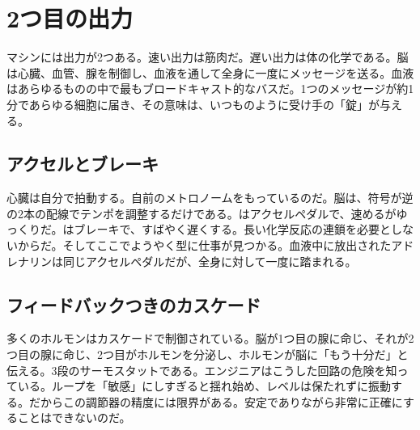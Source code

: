 \chapter{2つ目の出力}

マシンには出力が2つある。速い出力は筋肉だ。遅い出力は体の化学である。脳は心臓、血管、腺を制御し、血液を通して全身に一度にメッセージを送る。血液はあらゆるものの中で最もブロードキャスト的なバスだ。1つのメッセージが約1分であらゆる細胞に届き、その意味は、いつものように受け手の「錠」が与える。

\section*{アクセルとブレーキ}

心臓は自分で拍動する。自前のメトロノームをもっているのだ。脳は、符号が逆の2本の配線でテンポを調整するだけである。はアクセルペダルで、速めるがゆっくりだ。はブレーキで、すばやく遅くする。長い化学反応の連鎖を必要としないからだ。そしてここでようやく型に仕事が見つかる。血液中に放出されたアドレナリンは同じアクセルペダルだが、全身に対して一度に踏まれる。


\section*{フィードバックつきのカスケード}

多くのホルモンはカスケードで制御されている。脳が1つ目の腺に命じ、それが2つ目の腺に命じ、2つ目がホルモンを分泌し、ホルモンが脳に「もう十分だ」と伝える。3段のサーモスタットである。エンジニアはこうした回路の危険を知っている。ループを「敏感」にしすぎると揺れ始め、レベルは保たれずに振動する。だからこの調節器の精度には限界がある。安定でありながら非常に正確にすることはできないのだ。

